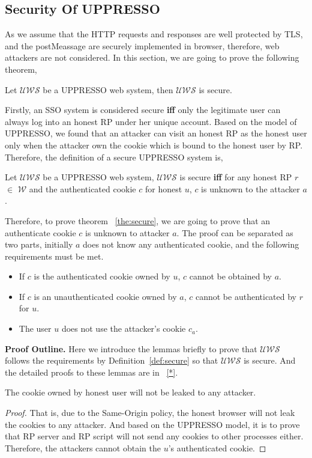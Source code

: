 \subsection{Security Of UPPRESSO}
As we assume that the HTTP requests and responses are well protected by TLS, and the postMeassage are securely implemented in browser, therefore, web attackers are not considered.
In this section, we are going to prove the following theorem,
\begin{theorem}
Let $\mathcal{UWS}$ be a UPPRESSO web system, then $\mathcal{UWS}$ is secure. 
\label{the:secure}
\end{theorem}
Firstly, an SSO system is considered secure \textbf{iff} only the legitimate user can always log into an honest RP under her unique account. Based on the model of UPPRESSO, we found that  an attacker can visit an honest RP as the honest user only when the attacker own the cookie which is bound to the honest user by RP. Therefore, the definition of a secure UPPRESSO system is, 
\begin{definition}
Let $\mathcal{UWS}$ be a UPPRESSO web system, $\mathcal{UWS}$ is secure \textbf{iff} for any honest RP $r$ $\in $ $\mathcal{W}$ and  the authenticated cookie $c$ for honest $u$,  $c$ is unknown to the attacker $a$. 
\label{def:secure}
\end{definition}
Therefore, to prove theorem ~\ref{the:secure}, we are going to prove that an authenticate cookie $c$ is unknown to attacker $a$. The proof can be separated as two parts, initially $a$ does not know any authenticated cookie, and the following requirements must be met.
\begin{itemize}
\item If $c$ is the authenticated cookie owned by $u$, $c$ cannot be obtained by $a$.
\item If $c$ is an unauthenticated cookie owned by $a$, $c$ cannot be authenticated by $r$ for $u$. 
\item The user $u$ does not use the attacker's cookie $c_a$.
\end{itemize}



\vspace{1mm}\noindent\textbf{Proof Outline. } 
Here we introduce the lemmas briefly to prove that $\mathcal{UWS}$ follows the requirements by Definition~\ref{def:secure} so that $\mathcal{UWS}$ is secure. And the detailed proofs to these lemmas are in ~\ref{*}.

\begin{lemma}
The cookie owned by honest user will not be leaked to any attacker.
\label{lemma:cookie}
\end{lemma}
\begin{proof}
That is, due to the Same-Origin policy, the honest browser will not leak the cookies to any attacker. And based on the UPPRESSO model, it is to prove that RP server and RP script will not send any cookies to other processes either. Therefore, the attackers cannot obtain the $u$'s authenticated  cookie. 
\end{proof}



